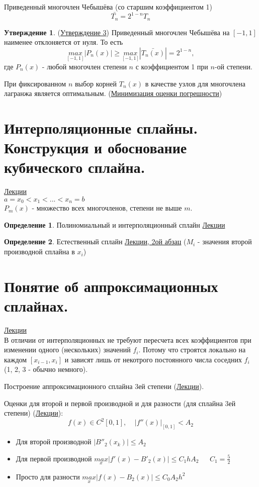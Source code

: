 \documentclass[specialist, subf, href, colorlinks=true, 12pt, times, mtpro, final]{disser}
\theoremstyle{definition}
\newtheorem{defn}{Определение}[section]
\newtheorem{state}{Утверждение}[section]
\begin{document}
	Приведенный многочлен Чебышёва (со старшим коэффициентом 1)
	$$
		\bar {T_n} = 2^{1 - n}T_n
	$$
	
	\begin{state} (\hyperlink {lects.19}{Утверждение 3})
		Приведенный многочлен Чебышёва на $[-1,1]$ наименее отклоняется от нуля. То есть 
		$$
			\underset{[-1,1]}{max}|P_n(x)| \ge \underset{[-1,1]}{max} |\bar{T_n(x)}| = 2^{1-n},
		$$
		где $P_n(x)$ - любой многочлен степени $n$ с коэффициентом 1 при $n$-ой степени.
	\end{state}

	При фиксированном $n$ выбор корней $T_n(x)$ в качестве узлов для многочлена лагранжа является оптимальным.
	(\hyperlink {lects.20}{Минимизация оценки погрешности})

	

\section {Интерполяционные сплайны. Конструкция и обоснование кубического сплайна.}
	\hyperlink {lects.22}{Лекции}\\
	$a = x_0 < x_1 < ... < x_n = b$\\
	$P_m(x)$ - множество всех многочленов, степени не выше $m$.
	\begin{defn}
		Полиномиальный и интерполяционный сплайн \hyperlink {lects.22}{Лекции}
	\end{defn}

	\begin{defn}
		Естественный сплайн \hyperlink {lects.23}{Лекции, 2ой абзац} ($M_i$ - значения второй производной сплайна в $x_i$)
	\end{defn}

\section {Понятие об аппроксимационных сплайнах.}
	\hyperlink {lects.25}{Лекции}\\
	В отличии от интерполяционных не требуют пересчета всех коэффициентов при изменении одного (нескольких) значений $f_i$. Потому что строятся локально на каждом $[x_{i-1}, x_i]$ и зависят лишь от некотрого постоянного числа соседних $f_i$ (1, 2, 3 - обычно немного).
	
	Построение аппроксимационного сплайна 3ей степени (\hyperlink {lects.25}{Лекции}).
	
	Оценки для второй и первой производной и для разности (для сплайна 3ей степени) (\hyperlink {lects.27}{Лекции}):
	$$
		f(x) \in C^2[0,1], \ \ \ \ \ |f''(x)|_{[0,1]} < A_2
	$$
	\begin{itemize}
		\item Для второй производной $|B''_2(x_k)| \le A_2$
		\item Для первой производной $\underset{x}{max}|f'(x)-B'_2(x)| \le C_1 h A_2 \ \ \ \ \ \  \ C_1 = \frac{5}{2}$
		\item Просто для разности $\underset{x}{max}|f(x)-B_2(x)| \le C_0 A_2 h^2$
			
	\end{itemize}
	
\end{document}
